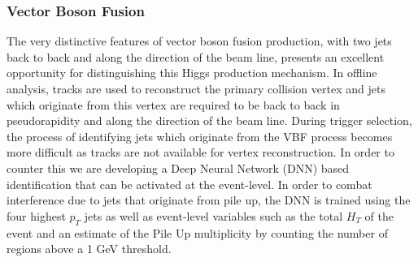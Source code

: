 \documentclass[preprint,12pt]{elsarticle}
\begin{document}
\subsubsection{Vector Boson Fusion}
The very distinctive features of vector boson fusion production, with 
two jets back to back and along the direction of the beam line, presents
an excellent opportunity for distinguishing this Higgs production mechanism.
In offline analysis, tracks are used to reconstruct the primary collision vertex 
and jets which originate from this vertex are required to be back to back
in pseudorapidity and along the direction of the beam line. During trigger selection, 
the process of identifying jets which originate from the VBF process 
becomes more difficult as tracks are not available for vertex reconstruction.
In order to counter this we are developing a Deep Neural Network (DNN) based
identification that can be activated at the event-level. In order to combat
interference due to jets that originate from pile up, the DNN is trained 
using the four highest $p_{T}$ jets as well as event-level variables such
as the total $H_{T}$ of the event and an estimate of the Pile Up multiplicity
by counting the number of regions above a 1 GeV threshold.%
\end{document}
